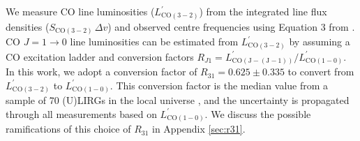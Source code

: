 \documentclass[a4paper,fleqn,usenatbib]{mnras}
\begin{document}
We measure CO line luminosities ($L^{\prime}_{\mathrm{CO(3-2)}}$) from the integrated line flux densities ($S_{\mathrm{CO(3-2)}}\,\Delta v$) and observed centre frequencies using Equation 3 from \citet{2005ARA&A..43..677S}.  CO $J=1\rightarrow0$ line luminosities can be estimated from $L^{\prime}_{\mathrm{CO(3-2)}}$ by assuming a CO excitation ladder and conversion factors $R_{J1} = L^{\prime}_{\mathrm{CO(J-(J-1))}} / L^{\prime}_{\mathrm{CO(1-0)}}$. In this work, we adopt a conversion factor of  $R_{31} = 0.625 \pm 0.335$  to convert from $L^{\prime}_{\mathrm{CO(3-2)}}$ to $L^{\prime}_{\mathrm{CO(1-0)}}$. This conversion factor is the median value from a sample of 70 (U)LIRGs in the local universe  \citep{2012MNRAS.426.2601P}, and the uncertainty is propagated through all measurements based on $L^{\prime}_{\mathrm{CO(1-0)}}$. We discuss the possible ramifications of this choice of $R_{31}$ in Appendix \ref{sec:r31}.
\end{document}
